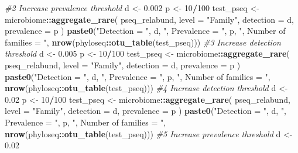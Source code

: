 \documentclass[
]{book}
\newenvironment{Shaded}{\begin{snugshade}}{\end{snugshade}}
\newcommand{\AttributeTok}[1]{\textcolor[rgb]{0.13,0.29,0.53}{#1}}
\newcommand{\CommentTok}[1]{\textcolor[rgb]{0.56,0.35,0.01}{\textit{#1}}}
\newcommand{\DecValTok}[1]{\textcolor[rgb]{0.00,0.00,0.81}{#1}}
\newcommand{\FloatTok}[1]{\textcolor[rgb]{0.00,0.00,0.81}{#1}}
\newcommand{\FunctionTok}[1]{\textcolor[rgb]{0.13,0.29,0.53}{\textbf{#1}}}
\newcommand{\NormalTok}[1]{#1}
\newcommand{\OtherTok}[1]{\textcolor[rgb]{0.56,0.35,0.01}{#1}}
\newcommand{\SpecialCharTok}[1]{\textcolor[rgb]{0.81,0.36,0.00}{\textbf{#1}}}
\newcommand{\StringTok}[1]{\textcolor[rgb]{0.31,0.60,0.02}{#1}}
\begin{document}
\begin{Shaded}
\begin{Highlighting}[]
\CommentTok{\#2 Increase prevalence threshold}
\NormalTok{d }\OtherTok{\textless{}{-}} \FloatTok{0.002}
\NormalTok{p }\OtherTok{\textless{}{-}} \DecValTok{10}\SpecialCharTok{/}\DecValTok{100}
\NormalTok{test\_pseq }\OtherTok{\textless{}{-}}\NormalTok{ microbiome}\SpecialCharTok{::}\FunctionTok{aggregate\_rare}\NormalTok{(}
\NormalTok{  pseq\_relabund, }\AttributeTok{level =} \StringTok{"Family"}\NormalTok{,}
  \AttributeTok{detection =}\NormalTok{ d, }\AttributeTok{prevalence =}\NormalTok{ p}
\NormalTok{)}
\FunctionTok{paste0}\NormalTok{(}\StringTok{"Detection = "}\NormalTok{, d, }\StringTok{", Prevalence = "}\NormalTok{, p,}
       \StringTok{", Number of families = "}\NormalTok{, }\FunctionTok{nrow}\NormalTok{(phyloseq}\SpecialCharTok{::}\FunctionTok{otu\_table}\NormalTok{(test\_pseq)))}
\CommentTok{\#3 Increase detection threshold}
\NormalTok{d }\OtherTok{\textless{}{-}} \FloatTok{0.005}
\NormalTok{p }\OtherTok{\textless{}{-}} \DecValTok{10}\SpecialCharTok{/}\DecValTok{100}
\NormalTok{test\_pseq }\OtherTok{\textless{}{-}}\NormalTok{ microbiome}\SpecialCharTok{::}\FunctionTok{aggregate\_rare}\NormalTok{(}
\NormalTok{  pseq\_relabund, }\AttributeTok{level =} \StringTok{"Family"}\NormalTok{,}
  \AttributeTok{detection =}\NormalTok{ d, }\AttributeTok{prevalence =}\NormalTok{ p}
\NormalTok{)}
\FunctionTok{paste0}\NormalTok{(}\StringTok{"Detection = "}\NormalTok{, d, }\StringTok{", Prevalence = "}\NormalTok{, p,}
       \StringTok{", Number of families = "}\NormalTok{, }\FunctionTok{nrow}\NormalTok{(phyloseq}\SpecialCharTok{::}\FunctionTok{otu\_table}\NormalTok{(test\_pseq)))}
\CommentTok{\#4 Increase detection threshold}
\NormalTok{d }\OtherTok{\textless{}{-}} \FloatTok{0.02}
\NormalTok{p }\OtherTok{\textless{}{-}} \DecValTok{10}\SpecialCharTok{/}\DecValTok{100}
\NormalTok{test\_pseq }\OtherTok{\textless{}{-}}\NormalTok{ microbiome}\SpecialCharTok{::}\FunctionTok{aggregate\_rare}\NormalTok{(}
\NormalTok{  pseq\_relabund, }\AttributeTok{level =} \StringTok{"Family"}\NormalTok{,}
  \AttributeTok{detection =}\NormalTok{ d, }\AttributeTok{prevalence =}\NormalTok{ p}
\NormalTok{)}
\FunctionTok{paste0}\NormalTok{(}\StringTok{"Detection = "}\NormalTok{, d, }\StringTok{", Prevalence = "}\NormalTok{, p,}
       \StringTok{", Number of families = "}\NormalTok{, }\FunctionTok{nrow}\NormalTok{(phyloseq}\SpecialCharTok{::}\FunctionTok{otu\_table}\NormalTok{(test\_pseq)))}
\CommentTok{\#5 Increase prevalence threshold}
\NormalTok{d }\OtherTok{\textless{}{-}} \FloatTok{0.02}

\end{Highlighting}
\end{Shaded}
\end{document}
